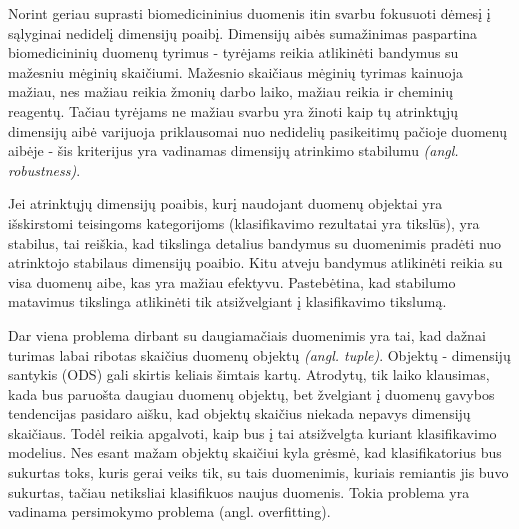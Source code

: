 
Norint geriau suprasti biomedicininius duomenis itin svarbu fokusuoti dėmesį į
sąlyginai nedidelį dimensijų poaibį. Dimensijų aibės sumažinimas paspartina
biomedicininių duomenų tyrimus - tyrėjams reikia atlikinėti bandymus su
mažesniu mėginių skaičiumi. Mažesnio skaičiaus mėginių tyrimas kainuoja
mažiau, nes mažiau reikia žmonių darbo laiko, mažiau reikia ir cheminių
reagentų. Tačiau tyrėjams ne mažiau svarbu yra žinoti kaip tų atrinktųjų
dimensijų aibė varijuoja priklausomai nuo nedidelių pasikeitimų pačioje
duomenų aibėje - šis kriterijus yra vadinamas dimensijų atrinkimo stabilumu
\textit{(angl. robustness)}.


Jei atrinktųjų dimensijų poaibis, kurį naudojant duomenų objektai yra išskirstomi
teisingoms kategorijoms (klasifikavimo rezultatai yra tikslūs),
yra stabilus, tai reiškia, kad tikslinga detalius bandymus su duomenimis 
pradėti nuo atrinktojo stabilaus dimensijų poaibio. Kitu atveju bandymus 
atlikinėti reikia su visa duomenų aibe, kas yra mažiau efektyvu. Pastebėtina, kad
stabilumo matavimus tikslinga atlikinėti tik atsižvelgiant į klasifikavimo
tikslumą.

Dar viena problema dirbant su daugiamačiais duomenimis yra tai, kad dažnai
turimas labai ribotas skaičius duomenų objektų \textit{(angl. tuple)}. 
Objektų - dimensijų santykis (ODS) gali skirtis keliais šimtais kartų. 
Atrodytų, tik laiko klausimas, kada bus paruošta
daugiau duomenų objektų, bet žvelgiant į duomenų gavybos tendencijas pasidaro
aišku, kad
objektų skaičius niekada nepavys dimensijų skaičiaus. Todėl reikia apgalvoti,
kaip bus į tai atsižvelgta kuriant klasifikavimo modelius. Nes esant mažam
objektų skaičiui kyla grėsmė, kad klasifikatorius bus sukurtas toks, kuris
gerai veiks tik, su tais duomenimis, kuriais remiantis jis buvo sukurtas, 
tačiau netiksliai klasifikuos naujus duomenis. Tokia problema yra vadinama 
persimokymo problema (angl. overfitting).

